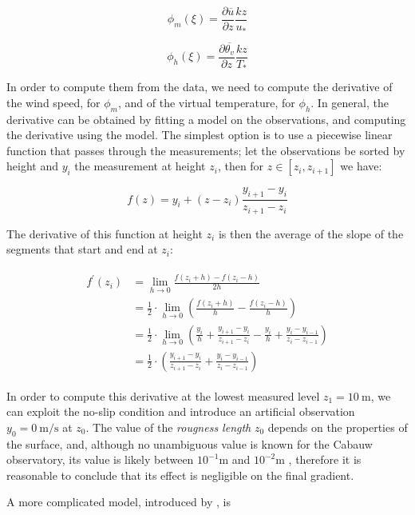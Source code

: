 \documentclass[a4paper]{book}
\begin{document}
$$
\phi_m(\xi)=\frac{\partial\overline{u}}{\partial z}\frac{kz}{u_*}
$$

$$
\phi_h(\xi)=\frac{\partial\overline{\theta_v}}{\partial z}\frac{kz}{T_*}
$$

In order to compute them from the data, we need to compute the derivative of the wind speed, for $\phi_m$, and of the virtual temperature, for $\phi_h$. In general, the derivative can be obtained by fitting a model on the observations, and computing the derivative using the model. The simplest option is to use a piecewise linear function that passes through the measurements; let the observations be sorted by height and $y_i$ the measurement at height $z_i$, then for $z\in[z_i,z_{i+1}]$ we have:

\begin{equation}
f(z)=y_i+(z-z_i)\frac{y_{i+1}-y_i}{z_{i+1}-z_i}
\end{equation}

The derivative of this function at height $z_i$ is then the average of the slope of the segments that start and end at $z_i$:

\begin{align}
\label{eq:fd_gradient}
\begin{split}
f^\prime(z_i)&=\lim_{h\rightarrow 0}\frac{f(z_i+h)-f(z_i-h)}{2h} \\
&=\frac{1}{2}\cdot\lim_{h\rightarrow 0}\left(\frac{f(z_i+h)}{h}-\frac{f(z_i-h)}{h}\right) \\
&=\frac{1}{2}\cdot\lim_{h\rightarrow 0}\left(
\frac{y_i}{h}+\frac{y_{i+1}-y_i}{z_{i+1}-z_i}-\frac{y_i}{h}+\frac{y_i-y_{i-1}}{z_i-z_{i-1}}
\right)\\
&=\frac{1}{2}\cdot\left(
\frac{y_{i+1}-y_i}{z_{i+1}-z_i}+\frac{y_i-y_{i-1}}{z_i-z_{i-1}}
\right)
\end{split}
\end{align}

In order to compute this derivative at the lowest measured level $z_1=\SI{10}{\meter}$, we can exploit the no-slip condition and introduce an artificial observation $y_0=\SI{0}{\meter\per\second}$ at $z_0$. The value of the \emph{rougness length} $z_0$ depends on the properties of the surface, and, although no unambiguous value is known for the Cabauw observatory, its value is likely between $10^{-1}$m and $10^{-2}$m \citep{cabauw_z0, cabauw_night}, therefore it is reasonable to conclude that its effect is negligible on the final gradient.

A more complicated model, introduced by \cite{windlogprofile}, is
\end{document}
